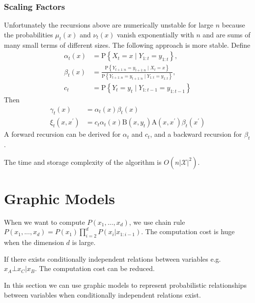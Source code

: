\documentclass[11pt,a4paper]{article}
\begin{document}
\subsubsection{Scaling Factors}
Unfortunately the recursions above are numerically unstable for large $n$ because the probabilities $\mu_t(x)$ and $\nu_t(x)$ vanish exponentially with $n$ and are sums of many small terms of different sizes. The following approach is more stable. Define
$$
\begin{aligned}
\alpha_t(x) &=\mathrm{P}\left\{X_t=x \mid Y_{1: t}=y_{1: t}\right\}, \\
\beta_t(x) &=\frac{\mathrm{P}\left\{Y_{t+1: n}=y_{t+1: n} \mid X_t=x\right\}}{\mathrm{P}\left\{Y_{t+1: n}=y_{t+1: n} \mid Y_{1: t}=y_{1: t}\right\}}, \\
c_t &=\mathrm{P}\left\{Y_t=y_t \mid Y_{1: t-1}=y_{1: t-1}\right\}
\end{aligned}
$$
Then
$$
\begin{aligned}
\gamma_t(x) &=\alpha_t(x) \beta_t(x) \\
\xi_t\left(x, x^{\prime}\right) &=c_t \alpha_t(x) \mathrm{B}\left(x, y_t\right) \mathrm{A}\left(x, x^{\prime}\right) \beta_t\left(x^{\prime}\right)
\end{aligned}
$$
A forward recursion can be derived for $\alpha_t$ and $c_t$, and a backward recursion for $\beta_t$.

The time and storage complexity of the algorithm is $O\left(n|\mathcal{X}|^2\right)$.











\section{Graphic Models}
When we want to compute $P(x_1,...,x_d)$, we use chain rule $P(x_1,...,x_d)=P(x_1)\prod_{i=2}^d P(x_i|x_{1:i-1})$. The computation cost is huge when the dimension $d$ is large.

If there exists conditionally independent relations between variables e.g. $x_A \bot x_C | x_B$. The computation cost can be reduced.

In this section we can use graphic models to represent probabilistic relationships between variables when conditionally independent relations exist.
\end{document}

